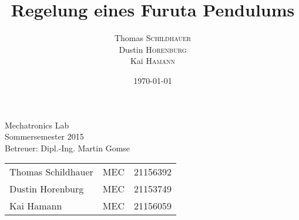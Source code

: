\title{Regelung eines Furuta Pendulums} %

\author{
Thomas \textsc{Schildhauer} \\
Dustin \textsc{Horenburg} \\
Kai \textsc{Hamann} } %


\date{\today} %



\maketitle %

\vspace{2cm}

\begin{center}
Mechatronics Lab \\
Sommersemester 2015 \\ 
Betreuer: Dipl.-Ing. Martin Gomse

\vspace{2cm}

\begin{tabular}{l c r}
Thomas Schildhauer	& MEC & 21156392 \\
Dustin Horenburg	& MEC & 21153749 \\
Kai Hamann			& MEC & 21156059

\end{tabular}
\end{center}


